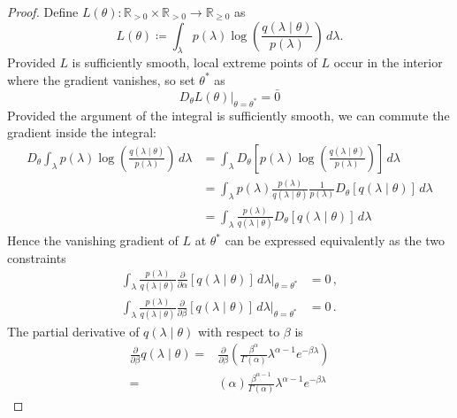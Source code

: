 \documentclass[twoside, 11pt]{article}
\newcommand{\reals}[0] {\mathbb{R}}
\begin{document}
\begin{proof}

Define $L(\theta) : \reals_{>0} \times \reals_{>0} \rightarrow \reals_{\geq 0}$ as
\begin{equation}
L(\theta) \coloneqq 
\int_{\lambda} p(\lambda) \log \left( \frac{q(\lambda \mid \theta) }{ p(\lambda) } \right) \, d\lambda .
\end{equation}
Provided $L$ is sufficiently smooth, local extreme points of $L$ occur in the interior where the gradient vanishes, so set $\theta^*$ as
\begin{equation}
D_{\theta} L(\theta) \bigr \rvert_{\theta=\theta^*} = \bar{0}
\end{equation}
Provided the argument of the integral is sufficiently smooth, we can commute the gradient inside the integral:
\begin{align}
D_{\theta}
\int_{\lambda} p(\lambda) \log \left( \frac{q(\lambda \mid \theta) }{ p(\lambda) } \right) \, d\lambda
& =
\int_{\lambda}
D_{\theta}
\left[
p(\lambda) \log \left( \frac{q(\lambda \mid \theta) }{ p(\lambda) } \right)
\right] \, d\lambda \\
& =
\int_{\lambda}
p(\lambda)
\frac{p(\lambda)}{q(\lambda \mid \theta)}
\frac{1}{p(\lambda)}
D_{\theta} \left[ q(\lambda \mid \theta) \right]
\, d\lambda \\
& =
\int_{\lambda}
\frac{p(\lambda)}{q(\lambda \mid \theta)}
D_{\theta} \left[ q(\lambda \mid \theta) \right]
\, d\lambda
\end{align}
Hence the vanishing gradient of $L$ at $\theta^*$ can be expressed equivalently as the two constraints
\begin{align}
\int_{\lambda}
\frac{p(\lambda)}{q(\lambda \mid \theta)}
\frac{\partial}{\partial \alpha} \left[ q(\lambda \mid \theta) \right]
\, d\lambda \bigr \vert_{\theta=\theta^*} & = 0 \, , \\
\int_{\lambda}
\frac{p(\lambda)}{q(\lambda \mid \theta)}
\frac{\partial}{\partial \beta} \left[ q(\lambda \mid \theta) \right]
\, d\lambda \bigr \vert_{\theta=\theta^*} & = 0 \, .
\end{align}
The partial derivative of $q(\lambda \mid \theta)$ with respect to $\beta$ is
\begin{align}
\frac{\partial}{\partial \beta} q(\lambda \mid \theta)
= & 
\frac{\partial}{\partial \beta} \left( \frac{\beta^{\alpha}}{\Gamma(\alpha)} \lambda^{\alpha-1} e^{-\beta \lambda} \right) \\
= &
(\alpha) \frac{\beta^{\alpha-1}}{\Gamma(\alpha)} \lambda^{\alpha-1} e^{-\beta \lambda}

\end{align}
\end{proof}
\end{document}
